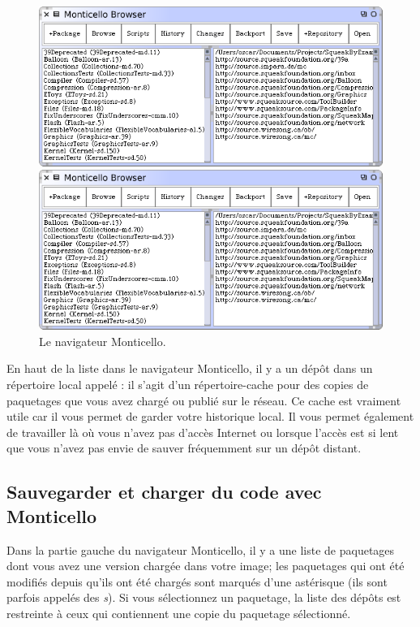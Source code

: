 \documentclass[a4paper,10pt,twoside]{book}
\begin{document}
\begin{figure}[hbt]
\ifluluelse
	{\centerline {\includegraphics[width=\textwidth]{MonticelloBrowser}}}
	{\centerline {\includegraphics[scale=0.7]{MonticelloBrowser}}}
\caption{Le navigateur Monticello.
\label{fig:monticello1}}
\end{figure}

En haut de la liste dans le navigateur Monticello, il y a un dépôt
dans un répertoire local appelé : il s'agit
d'un répertoire-cache pour des copies de paquetages que vous avez
chargé ou publié sur le réseau. Ce cache est vraiment utile car il
vous permet de garder votre historique local. Il vous permet également
de travailler là o\`u vous n'avez pas d'accès Internet ou lorsque 
l'accès est si lent que vous n'avez pas envie de sauver fréquemment 
sur un dépôt distant.

\subsection{Sauvegarder et charger du code avec Monticello}
Dans la partie gauche du navigateur Monticello, il y a une liste de
paquetages dont vous avez une version chargée dans votre image; les
paquetages qui ont été modifiés depuis qu'ils ont été chargés sont
marqués d'une 
astérisque
(ils sont parfois appelés des \emph{s}). Si vous sélectionnez un paquetage, la liste des dépôts est restreinte à ceux qui contiennent une copie du paquetage sélectionné.
\end{document}
